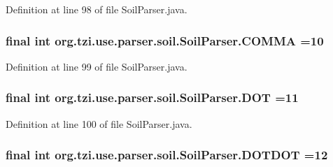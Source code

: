 Definition at line 98 of file Soil\-Parser.\-java.

\hypertarget{classorg_1_1tzi_1_1use_1_1parser_1_1soil_1_1_soil_parser_a54f8225abb1f7ab823e33a1c91463c9e}{
\subsubsection[{C\-O\-M\-M\-A}]{\setlength{\rightskip}{0pt plus 5cm}final int org.\-tzi.\-use.\-parser.\-soil.\-Soil\-Parser.\-C\-O\-M\-M\-A =10\hspace{0.3cm}{\ttfamily [static]}}}\label{classorg_1_1tzi_1_1use_1_1parser_1_1soil_1_1_soil_parser_a54f8225abb1f7ab823e33a1c91463c9e}


Definition at line 99 of file Soil\-Parser.\-java.

\hypertarget{classorg_1_1tzi_1_1use_1_1parser_1_1soil_1_1_soil_parser_a8cf155c149ec0e5c2235644a7e37980f}{
\subsubsection[{D\-O\-T}]{\setlength{\rightskip}{0pt plus 5cm}final int org.\-tzi.\-use.\-parser.\-soil.\-Soil\-Parser.\-D\-O\-T =11\hspace{0.3cm}{\ttfamily [static]}}}\label{classorg_1_1tzi_1_1use_1_1parser_1_1soil_1_1_soil_parser_a8cf155c149ec0e5c2235644a7e37980f}


Definition at line 100 of file Soil\-Parser.\-java.

\hypertarget{classorg_1_1tzi_1_1use_1_1parser_1_1soil_1_1_soil_parser_a06b1a673b8595015ad390e03eae30fc9}{
\subsubsection[{D\-O\-T\-D\-O\-T}]{\setlength{\rightskip}{0pt plus 5cm}final int org.\-tzi.\-use.\-parser.\-soil.\-Soil\-Parser.\-D\-O\-T\-D\-O\-T =12\hspace{0.3cm}{\ttfamily [static]}}}\label{classorg_1_1tzi_1_1use_1_1parser_1_1soil_1_1_soil_parser_a06b1a673b8595015ad390e03eae30fc9}


